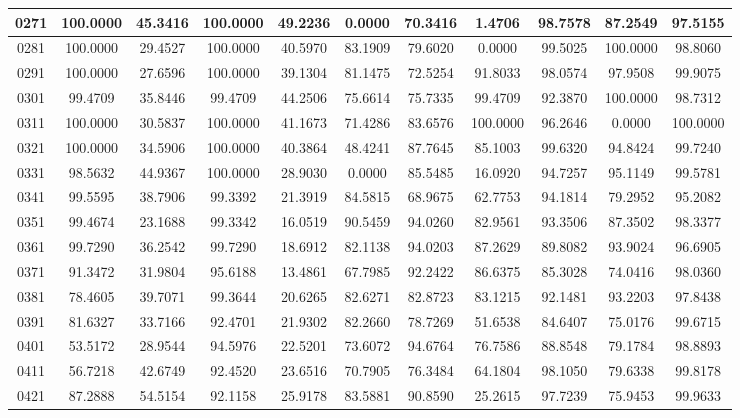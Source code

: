 \begin{appendices}
\begin{table}
\begin{tabular}{ |c|c|c|c|c|c|c|c|c|c|c| }
\hline
0271 &  100.0000 &  45.3416 &   100.0000 &  49.2236 &   0.0000 &  70.3416 &   1.4706 &  98.7578 &   87.2549 &  97.5155    \\
\hline
0281 &  100.0000 &  29.4527 &   100.0000 &  40.5970 &   83.1909 &  79.6020 &   0.0000 &  99.5025 &   100.0000 &  98.8060    \\
\hline
0291 &  100.0000 &  27.6596 &   100.0000 &  39.1304 &   81.1475 &  72.5254 &   91.8033 &  98.0574 &   97.9508 &  99.9075    \\
\hline
0301 &  99.4709 &  35.8446 &   99.4709 &  44.2506 &   75.6614 &  75.7335 &   99.4709 &  92.3870 &   100.0000 &  98.7312    \\
\hline
0311 &  100.0000 &  30.5837 &   100.0000 &  41.1673 &   71.4286 &  83.6576 &   100.0000 &  96.2646 &   0.0000 &  100.0000    \\
\hline
0321 &  100.0000 &  34.5906 &   100.0000 &  40.3864 &   48.4241 &  87.7645 &   85.1003 &  99.6320 &   94.8424 &  99.7240    \\
\hline
0331 &  98.5632 &  44.9367 &   100.0000 &  28.9030 &   0.0000 &  85.5485 &   16.0920 &  94.7257 &   95.1149 &  99.5781    \\
\hline
0341 &  99.5595 &  38.7906 &   99.3392 &  21.3919 &   84.5815 &  68.9675 &   62.7753 &  94.1814 &   79.2952 &  95.2082    \\
\hline
0351 &  99.4674 &  23.1688 &   99.3342 &  16.0519 &   90.5459 &  94.0260 &   82.9561 &  93.3506 &   87.3502 &  98.3377    \\
\hline
0361 &  99.7290 &  36.2542 &   99.7290 &  18.6912 &   82.1138 &  94.0203 &   87.2629 &  89.8082 &   93.9024 &  96.6905    \\
\hline
0371 &  91.3472 &  31.9804 &   95.6188 &  13.4861 &   67.7985 &  92.2422 &   86.6375 &  85.3028 &   74.0416 &  98.0360    \\
\hline
0381 &  78.4605 &  39.7071 &   99.3644 &  20.6265 &   82.6271 &  82.8723 &   83.1215 &  92.1481 &   93.2203 &  97.8438    \\
\hline
0391 &  81.6327 &  33.7166 &   92.4701 &  21.9302 &   82.2660 &  78.7269 &   51.6538 &  84.6407 &   75.0176 &  99.6715    \\
\hline
0401 &  53.5172 &  28.9544 &   94.5976 &  22.5201 &   73.6072 &  94.6764 &   76.7586 &  88.8548 &   79.1784 &  98.8893    \\
\hline
0411 &  56.7218 &  42.6749 &   92.4520 &  23.6516 &   70.7905 &  76.3484 &   64.1804 &  98.1050 &   79.6338 &  99.8178    \\
\hline
0421 &  87.2888 &  54.5154 &   92.1158 &  25.9178 &   83.5881 &  90.8590 &   25.2615 &  97.7239 &   75.9453 &  99.9633    \\


\end{tabular}
\end{table}
\end{appendices}

